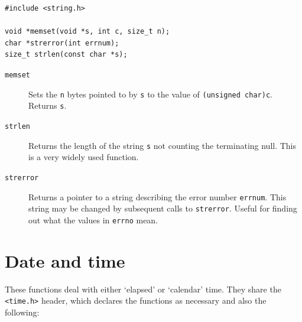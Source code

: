    \begin{Verbatim}
#include <string.h>

void *memset(void *s, int c, size_t n);
char *strerror(int errnum);
size_t strlen(const char *s);
\end{Verbatim}

   \begin{description}
   \item[\texttt{memset}]
     Sets the \texttt{n}  bytes  pointed  to  by  \texttt{s}  to
     the  value  of \texttt{(unsigned char)c}.  Returns
     \texttt{s}.

   \item[\texttt{strlen}]
     Returns the length of  the  string  \texttt{s}  not  counting  the
     terminating null.  This is a very widely used function.

   \item[\texttt{strerror}]
     Returns a pointer to a string describing the error number
     \texttt{errnum}.   This  string may be changed by subsequent calls to
     \texttt{strerror}.  Useful for finding out what the  values  in
     \texttt{errno} mean.
   \end{description}

  

 
        \section{Date and time}
        

  

  These functions deal with either `elapsed' or `calendar' time.
   They share the \texttt{<time.h>} header, which declares the
   functions as necessary and also the following:


